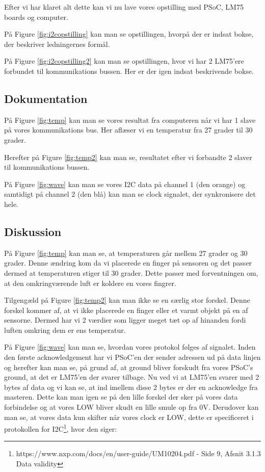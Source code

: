 \documentclass[../main.tex]{subfiles}
\begin{document}
Efter vi har klaret alt dette kan vi nu lave vores opstilling med PSoC, LM75 boards og computer.

På Figure \ref{fig:i2copstilling} kan man se opstillingen, hvorpå der er indsat bokse, der beskriver ledningernes formål.


På Figure \ref{fig:i2copstilling2} kan man se opstillingen, hvor vi har 2 LM75'ere forbundet til kommunikations bussen. Her er der igen indsat beskrivende bokse.

\subsection{Dokumentation}

På Figure \ref{fig:temp} kan man se vores resultat fra computeren når vi har 1 slave på vores kommunikations bus. Her aflæser vi en temperatur fra 27 grader til 30 grader.

Herefter på Figure \ref{fig:temp2} kan man se, resultatet efter vi forbandte 2 slaver til kommunikations bussen.

På Figure \ref{fig:wave} kan man se vores I2C data på channel 1 (den orange) og samtidigt på channel 2 (den blå) kan man se clock signalet, der synkronisere det hele.


\subsection{Diskussion}
På Figure \ref{fig:temp} kan man se, at temperaturen går mellem 27 grader og 30 grader. Denne ændring kom da vi placerede en finger på sensoren og det passer dermed at temperaturen stiger til 30 grader.
Dette passer med forventningen om, at den omkringværende luft er koldere en vores fingrer.

Tilgengæld på Figure \ref{fig:temp2} kan man ikke se en særlig stor forskel. Denne forskel kommer af, at vi ikke placerede en finger eller et varmt objekt på en af sensorne. 
Dermed har vi 2 værdier som ligger meget tæt op af hinanden fordi luften omkring dem er ens temperatur.

På Figure \ref{fig:wave} kan man se, hvordan vores protokol følges af signalet. 
Inden den første acknowledgement har vi PSoC'en der sender adressen ud på data linjen og herefter kan man se, på grund af, at ground bliver forskudt fra vores PSoC's ground, at det er LM75'en der svarer tilbage.
Nu ved vi at LM75'en svarer med 2 bytes af data og vi kan se, at ind imellem disse 2 bytes er der en acknowledge fra masteren. Dette kan man igen se på den lille forskel der sker på vores data forbindelse og at vores LOW bliver skudt en lille smule op fra 0V.
Derudover kan man se, at vores data kun skifter når vores clock er LOW, dette er specificeret i protokollen for I2C\footnote{https://www.nxp.com/docs/en/user-guide/UM10204.pdf - Side 9, Afsnit 3.1.3 Data validity}, hvor den siger:
\end{document}
